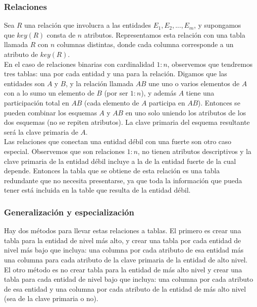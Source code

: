 \documentclass[a4paper]{article}
\begin{document}
\subsubsection*{Relaciones}
Sea $R$ una relaci\'on que involucra a las entidades $E_{1}, E_{2}, ..., E_{m}$, y
supongamos que $key(R)$ consta de $n$ atributos. Representamos esta relaci\'on con una
tabla llamada $R$ con $n$ columnas distintas, donde cada columna corresponde a un
atributo de $key(R)$. \\
En el caso de relaciones binarias con cardinalidad $1:n$, observemos que tendremos tres
tablas: una por cada entidad y una para la relaci\'on. Digamos que las entidades son $A$
y $B$, y la relaci\'on llamada $AB$ une uno o varios elementos de $A$ con a lo sumo un
elemento de $B$ (por ser $1:n$), y adem\'as $A$ tiene una participaci\'on total en $AB$
(cada elemento de $A$ participa en $AB$). Entonces se pueden combinar los esquemas $A$ y
$AB$ en uno solo uniendo los atributos de los dos esquemas (no se repiten atributos). La
clave primaria del esquema resultante ser\'a la clave primaria de $A$. \\
Las relaciones que conectan una entidad d\'ebil con una fuerte son otro caso especial.
Observemos que son relaciones $1:n$, no tienen atributos descriptivos y la clave primaria
de la entidad d\'ebil incluye a la de la entidad fuerte de la cual depende. Entonces la
tabla que se obtiene de esta relaci\'on es una tabla redundante que no necesita presentarse,
ya que toda la informaci\'on que pueda tener est\'a incluida en la table que resulta de
la entidad d\'ebil.
\subsubsection*{Generalizaci\'on y especializaci\'on}
Hay dos m\'etodos para llevar estas relaciones a tablas. El primero es crear una tabla para
la entidad de nivel m\'as alto, y crear una tabla por cada entidad de nivel m\'as bajo que
incluya: una columna por cada atributo de esa entidad m\'as una columna para cada atributo
de la clave primaria de la entidad de alto nivel. \\
El otro m\'etodo es no crear tabla para la entidad de m\'as alto nivel y crear una tabla
para cada entidad de nivel bajo que incluya: una columna por cada atributo de esa entidad y
una columna por cada atributo de la entidad de m\'as alto nivel (sea de la clave primaria
o no).
\end{document}
